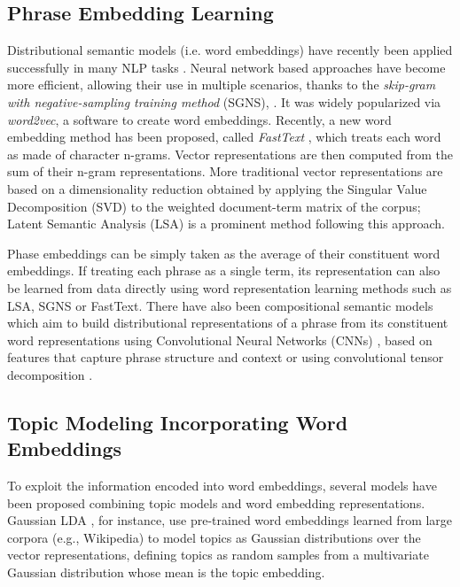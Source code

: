 \documentclass[letterpaper]{article}
\begin{document}
\subsection{Phrase Embedding Learning} 

Distributional semantic models (i.e. word embeddings) have recently been applied successfully in many NLP tasks \cite{Levy15}. Neural network based approaches have become more efficient, allowing their use in multiple scenarios, thanks to the \textit{skip-gram with negative-sampling training method} (SGNS), \cite{Mikolov13a,Mikolov13b}. It was widely popularized via \textit{word2vec}, a software to create word embeddings. Recently, a new word embedding method has been proposed, called \textit{FastText} \cite{Joulin16}, which treats each word as made of character n-grams. Vector representations are then computed from the sum of their n-gram representations.
More traditional vector representations are based on a dimensionality reduction obtained by applying the Singular Value Decomposition (SVD) to the weighted document-term matrix of the corpus; Latent Semantic Analysis (LSA) \cite{Deerwester90} is a prominent method following this approach.

Phase embeddings can be simply taken as the average of their constituent word embeddings. If treating each phrase as a single term, its representation can also be learned from data directly using word representation learning methods such as LSA, SGNS or FastText. There have also been compositional semantic models which aim to build distributional representations of a phrase from its constituent 
word representations using Convolutional Neural Networks (CNNs) \cite{le2014distributed}, based on features that capture phrase structure and context \cite{yu2015learning} or using convolutional tensor decomposition \cite{huang2016unsupervised}.

\subsection{Topic Modeling Incorporating Word Embeddings}

To exploit the information encoded into word embeddings, several models have been proposed combining topic models and word embedding representations. Gaussian LDA \cite{Das15}, for instance, use pre-trained word embeddings learned from large corpora (e.g., Wikipedia) to model topics as Gaussian distributions over the vector representations, defining topics as random samples from a multivariate Gaussian distribution whose mean is the topic embedding. 
\end{document}
